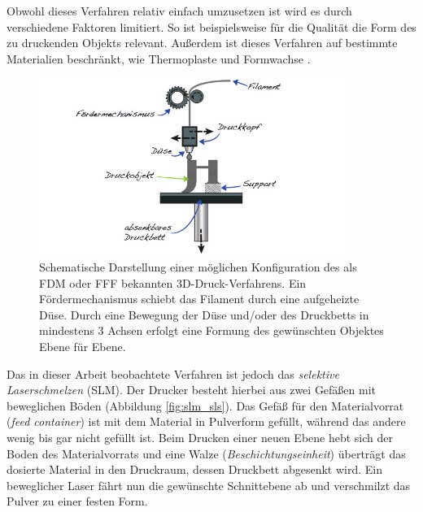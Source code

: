 		Obwohl dieses Verfahren relativ einfach umzusetzen ist wird es durch verschiedene Faktoren
		limitiert. So ist beispielsweise für die Qualität die Form des zu druckenden Objekts
		relevant. Außerdem ist dieses Verfahren auf bestimmte Materialien beschränkt, wie
		Thermoplaste und Formwachse \cite{wikipedia2021fused}.

		\begin{figure}[ht]
			\centering
			\includegraphics[width=0.9\textwidth]{chapter/main/img/fdm.png}
			\caption[Schematische Darstellung des FDM-/FFF-Verfahrens]{Schematische Darstellung
			einer möglichen Konfiguration des als FDM oder FFF bekannten 3D-Druck-Verfahrens. Ein
			Fördermechanismus schiebt das Filament durch eine aufgeheizte Düse. Durch eine
			Bewegung der Düse und/oder des Druckbetts in mindestens 3 Achsen erfolgt eine Formung
			des gewünschten Objektes Ebene für Ebene. \cite[S. 114]{horsch20143d}}
			\label{fig:fdm}
		\end{figure}

		Das in dieser Arbeit beobachtete Verfahren ist jedoch das \emph{selektive Laserschmelzen}
		(SLM). Der Drucker besteht hierbei aus zwei Gefäßen mit beweglichen Böden (Abbildung
		\ref{fig:slm_sls}). Das Gefäß für den Materialvorrat (\emph{feed container}) ist mit dem
		Material in Pulverform gefüllt, während das andere wenig bis gar nicht gefüllt ist. Beim
		Drucken einer neuen Ebene hebt sich der Boden des Materialvorrats und eine Walze
		(\emph{Beschichtungseinheit}) überträgt das dosierte Material in den Druckraum, dessen
		Druckbett abgesenkt wird. Ein beweglicher Laser fährt nun die gewünschte Schnittebene ab
		und verschmilzt das Pulver zu einer festen Form.

